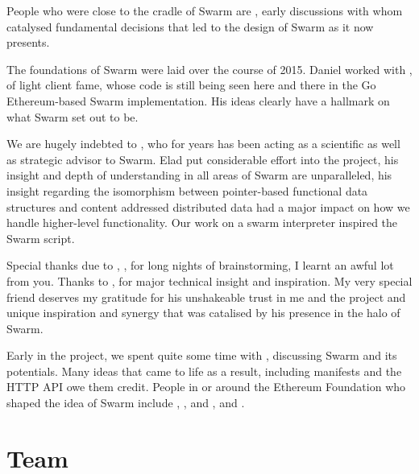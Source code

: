People who were close to the cradle of Swarm are ,  early discussions with whom catalysed fundamental decisions that led to the design of Swarm as it now presents.

The foundations of Swarm were laid over the course of 2015.
Daniel worked with , of light client fame, whose code is still being seen here and there in the Go Ethereum-based Swarm implementation. His ideas clearly have a hallmark on what Swarm set out to be. 

We are hugely indebted to , who for years has been acting as a scientific as well as strategic advisor to Swarm. Elad put considerable effort into the project, his insight and depth of understanding in all areas of Swarm are unparalleled, his insight regarding the isomorphism between pointer-based functional data structures and content addressed distributed data had a major impact on how we handle higher-level functionality. Our work on a swarm interpreter inspired the Swarm script.

Special thanks due to , ,  for long nights of brainstorming, I learnt an awful lot from you. Thanks to ,  for major technical insight and inspiration.
My very special friend  deserves my gratitude for his unshakeable trust in me and the project and unique inspiration and synergy that was catalised by his presence in the halo of Swarm.

Early in the project, we spent quite some time with ,  discussing Swarm and its potentials. Many ideas that came to life as a result, including manifests and the HTTP API owe them credit. People in or around the Ethereum Foundation who shaped the idea of Swarm include , ,  and ,  and . 

\section*{Team}

